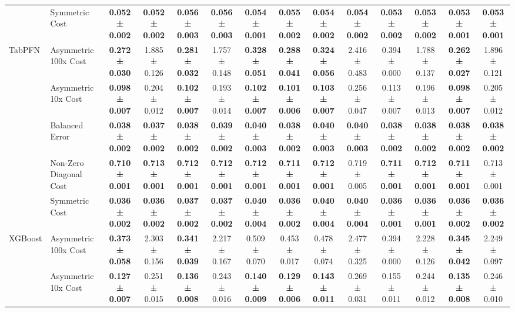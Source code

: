 \begin{table}[H]
{\begin{tabular}{llcccccccccccc}
 & Symmetric Cost & \textbf{0.052 ± 0.002} & \textbf{0.052 ± 0.002} & \textbf{0.056 ± 0.003} & \textbf{0.056 ± 0.003} & \textbf{0.054 ± 0.001} & \textbf{0.055 ± 0.002} & \textbf{0.054 ± 0.002} & \textbf{0.054 ± 0.002} & \textbf{0.053 ± 0.002} & \textbf{0.053 ± 0.002} & \textbf{0.053 ± 0.001} & \textbf{0.053 ± 0.001} \\
\cline{1-14}
\multirow[t]{5}{*}{TabPFN} & Asymmetric 100x Cost & \textbf{0.272 ± 0.030} & 1.885 ± 0.126 & \textbf{0.281 ± 0.032} & 1.757 ± 0.148 & \textbf{0.328 ± 0.051} & \textbf{0.288 ± 0.041} & \textbf{0.324 ± 0.056} & 2.416 ± 0.483 & 0.394 ± 0.000 & 1.788 ± 0.137 & \textbf{0.262 ± 0.027} & 1.896 ± 0.121 \\
 & Asymmetric 10x Cost & \textbf{0.098 ± 0.007} & 0.204 ± 0.012 & \textbf{0.102 ± 0.007} & 0.193 ± 0.014 & \textbf{0.102 ± 0.007} & \textbf{0.101 ± 0.006} & \textbf{0.103 ± 0.007} & 0.256 ± 0.047 & 0.113 ± 0.007 & 0.196 ± 0.013 & \textbf{0.098 ± 0.007} & 0.205 ± 0.012 \\
 & Balanced Error & \textbf{0.038 ± 0.002} & \textbf{0.037 ± 0.002} & \textbf{0.038 ± 0.002} & \textbf{0.039 ± 0.002} & \textbf{0.040 ± 0.003} & \textbf{0.038 ± 0.002} & \textbf{0.040 ± 0.003} & \textbf{0.040 ± 0.003} & \textbf{0.038 ± 0.002} & \textbf{0.038 ± 0.002} & \textbf{0.038 ± 0.002} & \textbf{0.038 ± 0.002} \\
 & Non-Zero Diagonal Cost & \textbf{0.710 ± 0.001} & \textbf{0.713 ± 0.001} & \textbf{0.712 ± 0.001} & \textbf{0.712 ± 0.001} & \textbf{0.712 ± 0.001} & \textbf{0.711 ± 0.001} & \textbf{0.712 ± 0.001} & 0.719 ± 0.005 & \textbf{0.711 ± 0.001} & \textbf{0.712 ± 0.001} & \textbf{0.711 ± 0.001} & 0.713 ± 0.001 \\
 & Symmetric Cost & \textbf{0.036 ± 0.002} & \textbf{0.036 ± 0.002} & \textbf{0.037 ± 0.002} & \textbf{0.037 ± 0.002} & \textbf{0.040 ± 0.004} & \textbf{0.036 ± 0.002} & \textbf{0.040 ± 0.004} & \textbf{0.040 ± 0.004} & \textbf{0.036 ± 0.001} & \textbf{0.036 ± 0.001} & \textbf{0.036 ± 0.002} & \textbf{0.036 ± 0.002} \\
\cline{1-14}
\multirow[t]{5}{*}{XGBoost} & Asymmetric 100x Cost & \textbf{0.373 ± 0.058} & 2.303 ± 0.156 & \textbf{0.341 ± 0.039} & 2.217 ± 0.167 & 0.509 ± 0.070 & 0.453 ± 0.017 & 0.478 ± 0.074 & 2.477 ± 0.325 & 0.394 ± 0.000 & 2.228 ± 0.126 & \textbf{0.345 ± 0.042} & 2.249 ± 0.097 \\
 & Asymmetric 10x Cost & \textbf{0.127 ± 0.007} & 0.251 ± 0.015 & \textbf{0.136 ± 0.008} & 0.243 ± 0.016 & \textbf{0.140 ± 0.009} & \textbf{0.129 ± 0.006} & \textbf{0.143 ± 0.011} & 0.269 ± 0.031 & 0.155 ± 0.011 & 0.244 ± 0.012 & \textbf{0.135 ± 0.008} & 0.246 ± 0.010 \\

\end{tabular}}
\end{table}
